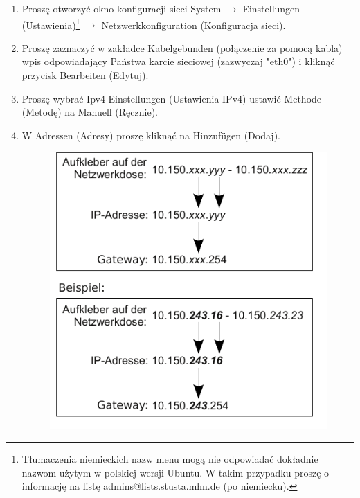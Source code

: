 \documentclass[a4paper,12pt]{scrartcl}
\begin{document}
\begin{enumerate}
    \item Proszę otworzyć okno konfiguracji sieci System $\rightarrow$
      Einstellungen (Ustawienia)\footnote{Tłumaczenia niemieckich nazw
        menu mogą nie odpowiadać dokładnie nazwom użytym w polskiej
        wersji Ubuntu. W takim przypadku proszę o informację na listę
        admins@lists.stusta.mhn.de (po niemiecku).} $\rightarrow$ Netzwerkkonfiguration (Konfiguracja sieci).
    \item Proszę zaznaczyć w zakładce Kabelgebunden (połączenie za pomocą kabla) wpis odpowiadający Państwa karcie sieciowej (zazwyczaj "eth0") i kliknąć przycisk Bearbeiten (Edytuj).
    \item Proszę wybrać Ipv4-Einstellungen (Ustawienia IPv4) ustawić Methode (Metodę) na Manuell (Ręcznie).
    \item W Adressen (Adresy) proszę kliknąć na Hinzufügen (Dodaj).
      \begin{figure}[h!]
        \centering
        \begin{minipage}[c]{0.45\linewidth}
          \centering
          \includegraphics[width=\linewidth,keepaspectratio]{Bilder/IP_Gerneric}
        \end{minipage}
        \begin{minipage}[c]{0.5\linewidth}

\end{minipage}
\end{figure}
\end{enumerate}
\end{document}
